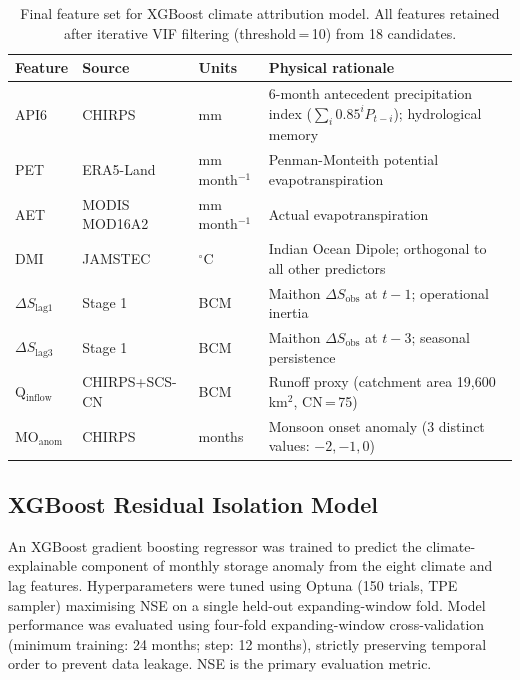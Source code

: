 \documentclass[preprint,12pt,authoryear]{elsarticle}
\newcommand{\dS}{\Delta S}
\newcommand{\dSobs}{\Delta S_{\mathrm{obs}}}
\begin{document}
\begin{table}[htbp]
  \centering
  \caption{Final feature set for XGBoost climate attribution model.
           All features retained after iterative VIF filtering
           (threshold\,=\,10) from 18 candidates.}
  \label{tab:features}
  \begin{tabularx}{\linewidth}{lXlX}
    \toprule
    Feature & Source & Units & Physical rationale \\
    \midrule
    API6 & CHIRPS & mm & 6-month antecedent precipitation index ($\sum_i 0.85^i P_{t-i}$); hydrological memory \\
    PET & ERA5-Land & mm\,month$^{-1}$ & Penman-Monteith potential evapotranspiration \\
    AET & MODIS MOD16A2 & mm\,month$^{-1}$ & Actual evapotranspiration \\
    DMI & JAMSTEC & $^\circ$C & Indian Ocean Dipole; orthogonal to all other predictors \\
    $\dS_{\text{lag1}}$ & Stage 1 & BCM & Maithon $\dSobs$ at $t-1$; operational inertia \\
    $\dS_{\text{lag3}}$ & Stage 1 & BCM & Maithon $\dSobs$ at $t-3$; seasonal persistence \\
    Q$_{\text{inflow}}$ & CHIRPS+SCS-CN & BCM & Runoff proxy (catchment area 19,600\,km$^2$, CN\,=\,75) \\
    MO$_{\text{anom}}$ & CHIRPS & months & Monsoon onset anomaly (3 distinct values: $-2,-1,0$) \\
    \bottomrule
  \end{tabularx}
\end{table}

\subsection{XGBoost Residual Isolation Model}
\label{sec:methods_xgb}

An XGBoost gradient boosting regressor \citep{Chen2016} was trained to predict
the climate-explainable component of monthly storage anomaly from the eight
climate and lag features. Hyperparameters were tuned
using Optuna (150 trials, TPE sampler) maximising NSE on a single held-out
expanding-window fold. Model performance was evaluated using four-fold
expanding-window cross-validation (minimum training: 24 months; step: 12
months), strictly preserving temporal order to prevent data leakage. NSE
\citep{Nash1970} is the primary evaluation metric.
\end{document}
